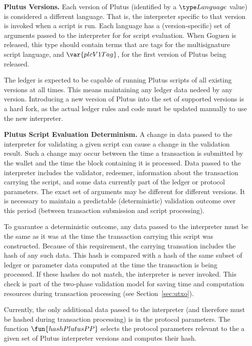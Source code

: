 \textbf{Plutus Versions.} Each
version of Plutus (identified by a $\Language$ value) is considered a different
language. That is, the interpreter
specific to that version is invoked when a script is run. Each language
has a (version-specific) set of arguments passed to the interpreter for
for script evaluation. When Goguen is released, this type should contain
terms that are tags for the multisignature script language, and $\var{plcV1Tag}$,
for the first version of Plutus being released.

The ledger is expected to be capable of running Plutus scripts of
all existing versions at all times. This means maintaining any ledger
data nedeed by any version. Introducing a new version of Plutus
into the set of supported versions is a hard fork, as the actual ledger rules
and code must be updated manually to use the new interpreter.

\textbf{Plutus Script Evaluation Determinism.}
A change in data passed to the interpreter for
validating a given script can cause a change in the validation result. Such
a change may occur between the time a transaction is submitted by the wallet
and the time the block containing it is processed. Data passed to the interpreter
includes the validator, redeemer, information about the transaction carrying
the script, and some data currently part of the ledger or protocol parameters.
The exact set of arguments may be different for different versions.
It is necessary to maintain a predictable
(deterministic) validation outcome over this period (between transaction
submission and script processing).

To guarantee a deterministic outcome,
any data passed to the interpreter must be
the same as it was at the time the transaction carrying this script was
constructed.
Because of this requirement, the carrying transation includes the hash of any such data.
This hash is compared with
a hash of the same subset of ledger or parameter data computed at the time the transaction is being
processed. If these hashes do not match, the interpreter is never invoked.
This check is part of the two-phase validation model for saving time and computation
resources during transaction processing (see Section~\ref{sec:utxo}).

Currently, the only additional data passed to the interpreter (and therefore must
be hashed during transaction processing) is in the protocol parameters. The
function $\fun{hashPlutusPP}$ selects the protocol parameters relevant to
the a given set of Plutus interpreter versions and computes their hash.

